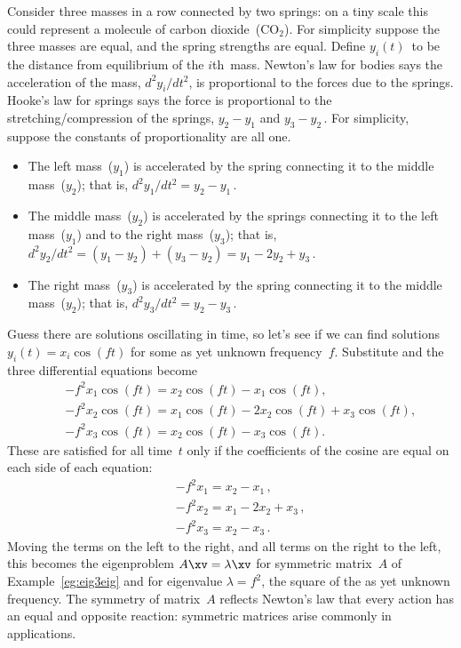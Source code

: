 \begin{example} \label{eg:eig3vib}
Consider three masses in a row connected by two springs: on a tiny scale this could represent a molecule of carbon dioxide~(\(\text{CO}_2\)).
For simplicity suppose the three masses are equal, and the spring strengths are equal.
Define \(y_i(t)\)~to be the distance from equilibrium of the \(i\)th~mass.
Newton's law for bodies says the acceleration of the mass, \(d^2y_i/dt^2\), is proportional to the forces due to the springs.
Hooke's law for springs says the force is proportional to the stretching\slash compression of the springs, \(y_2-y_1\) and \(y_3-y_2\)\,.
For simplicity, suppose the constants of proportionality are all one.
\begin{itemize}
\item The left mass~(\(y_1\)) is accelerated by the spring connecting it to the middle mass~(\(y_2\)); that is, \(d^2y_1/dt^2=y_2-y_1\)\,.
\item The middle mass~(\(y_2\)) is accelerated by the springs connecting it to the left mass~(\(y_1\)) and to the right mass~(\(y_3\)); that is, \(d^2y_2/dt^2=(y_1-y_2)+(y_3-y_2)=y_1-2y_2+y_3\)\,.
\item The right mass~(\(y_3\)) is accelerated by the spring connecting it to the middle mass~(\(y_2\)); that is, \(d^2y_3/dt^2=y_2-y_3\)\,.
\end{itemize}
Guess there are solutions oscillating in time, so let's see if we can find solutions \(y_i(t)=x_i\cos(ft)\) for some as yet unknown frequency~\(f\).
Substitute and the three differential equations become
\begin{eqnarray*}
&&-f^2x_1\cos(ft)=x_2\cos(ft)-x_1\cos(ft),
\\&&-f^2x_2\cos(ft)=x_1\cos(ft)-2x_2\cos(ft)+x_3\cos(ft),
\\&&-f^2x_3\cos(ft)=x_2\cos(ft)-x_3\cos(ft).
\end{eqnarray*}
These are satisfied for all time~\(t\) only if the coefficients of the cosine are equal on each side of each equation:
\begin{eqnarray*}
&&-f^2x_1=x_2-x_1\,,
\\&&-f^2x_2=x_1-2x_2+x_3\,,
\\&&-f^2x_3=x_2-x_3\,.
\end{eqnarray*}
Moving the terms on the left to the right, and all terms on the right to the left, this becomes the eigenproblem \(A\xv=\lambda\xv\) for symmetric matrix~\(A\) of Example~\ref{eg:eig3eig} and for eigenvalue \(\lambda=f^2\), the square of the as yet unknown frequency.
The symmetry of matrix~\(A\) reflects Newton's law that every action has an equal and opposite reaction: symmetric matrices arise commonly in applications.


\end{example}
